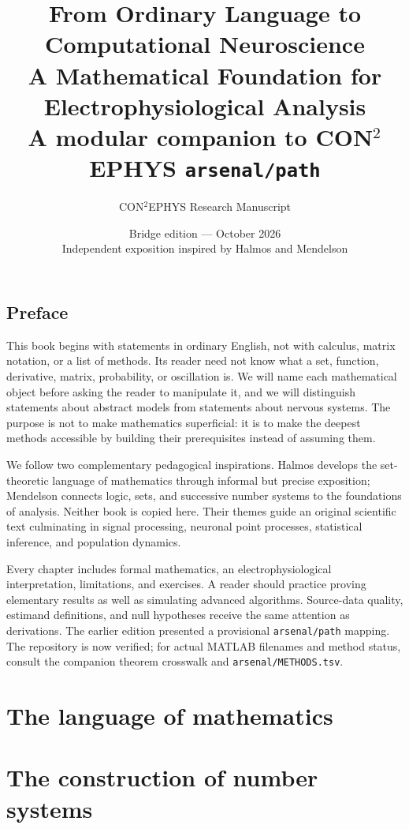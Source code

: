 \documentclass[11pt,a4paper,oneside,openany]{book}
\title{\Huge From Ordinary Language to\\ Computational Neuroscience\\[1em]\Large A Mathematical Foundation for Electrophysiological Analysis\\[0.5em]\normalsize A modular companion to CON$^2$EPHYS \texttt{arsenal/path}}
\author{CON$^2$EPHYS Research Manuscript}
\date{Bridge edition --- October 2026\\\small Independent exposition inspired by Halmos and Mendelson}
\numberwithin{equation}{chapter}
\theoremstyle{definition}
\begin{document}
\frontmatter
\maketitle
\chapter*{Preface}
This book begins with statements in ordinary English, not with calculus, matrix notation, or a list of methods. Its reader need not know what a set, function, derivative, matrix, probability, or oscillation is. We will name each mathematical object before asking the reader to manipulate it, and we will distinguish statements about abstract models from statements about nervous systems. The purpose is not to make mathematics superficial: it is to make the deepest methods accessible by building their prerequisites instead of assuming them.

We follow two complementary pedagogical inspirations. Halmos develops the set-theoretic language of mathematics through informal but precise exposition; Mendelson connects logic, sets, and successive number systems to the foundations of analysis. Neither book is copied here. Their themes guide an original scientific text culminating in signal processing, neuronal point processes, statistical inference, and population dynamics.

Every chapter includes formal mathematics, an electrophysiological interpretation, limitations, and exercises. A reader should practice proving elementary results as well as simulating advanced algorithms. Source-data quality, estimand definitions, and null hypotheses receive the same attention as derivations. The earlier edition presented a provisional \texttt{arsenal/path} mapping. The repository is now verified; for actual MATLAB filenames and method status, consult the companion theorem crosswalk and \texttt{arsenal/METHODS.tsv}.
\tableofcontents

\mainmatter
\part{The language of mathematics}







\part{The construction of number systems}






\end{document}
